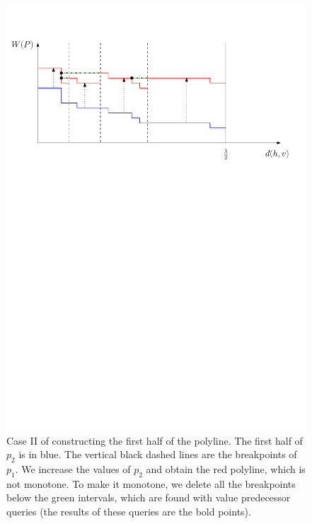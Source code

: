\documentclass[a4paper,UKenglish]{lipics-v2016}
\theoremstyle{plain}
\begin{document}
\begin{figure}[ht]
\begin{center}
\includegraphics[scale=0.6]{polyline_first_half_construction_case2}
\end{center}
\caption{Case II of constructing the first half of the polyline. The first half of $p_2$ is in blue. The vertical black dashed lines are the breakpoints of $p_1$. We increase the values of $p_{2}$ and obtain the red polyline, which is not monotone. To make it monotone, we delete all the breakpoints below the green intervals, which are found with value predecessor queries (the results of these queries are the bold points).\label{figure of the second case in the construction of the first half of the polyline}
}
\end{figure}
\end{document}
